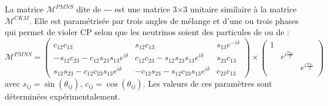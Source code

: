 La matrice $\mathcal{M}^{PMNS}$ dite de --- est une matrice \num{3}$\times$\num{3} unitaire similaire à la matrice $\mathcal{M}^{CKM}$. Elle est paramétrisée par trois angles de mélange et d'une ou trois phases qui permet de violer CP selon que les neutrinos soient des particules de  ou de  :
\begin{equation}
\mathcal{M}^{PMNS}= 
\begin{pmatrix} 
c_{12}c_{13} & s_{12}c_{13} & s_{13}e^{-i\delta} \\
-s_{12}c_{23}-c_{12}s_{23}s_{13}e^{i\delta} & c_{12}c_{23}-s_{12}s_{23}s_{13}e^{i\delta} & s_{23}c_{13} \\
s_{12}s_{23}-c_{12}c_{23}s_{13}e^{i\delta} & -c_{12}s_{23}-s_{12}c_{23}s_{13}e^{i\delta} & c_{23}c_{13}
\end{pmatrix}\times \begin{pmatrix}
    1 \\
    & e^{i\frac{\alpha_{21}}{2}} \\
    & & e^{i\frac{\alpha_{31}}{2}} \\
\end{pmatrix}
\end{equation}
avec $s_{ij}=\sin(\theta_{ij})$, $c_{ij}=\cos(\theta_{ij})$.
Les valeurs de ces paramètres sont déterminées expérimentalement.
